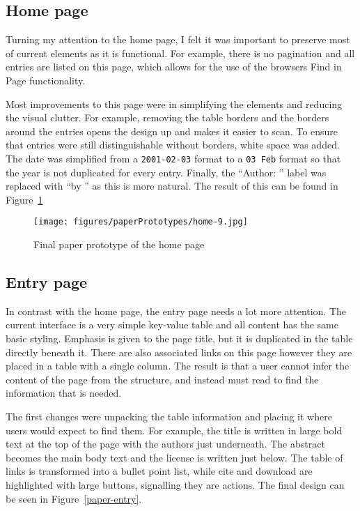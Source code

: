 \documentclass[bsc,frontabs,oneside,singlespacing,parskip,deptreport,logo]{infthesis}
\begin{document}
\subsection{Home page}

Turning my attention to the home page, I felt it was important to preserve most of current elements as it is functional. For example, there is no pagination and all entries are listed on this page, which allows for the use of the browsers Find in Page functionality. 

Most improvements to this page were in simplifying the elements and reducing the visual clutter. For example, removing the table borders and the borders around the entries opens the design up and makes it easier to scan. To ensure that entries were still distinguishable without borders, white space was added. The date was simplified from a \verb|2001-02-03| format to a \verb|03 Feb| format so that the year is not duplicated for every entry. Finally, the ``Author: '' label was replaced with ``by '' as this is more natural. The result of this can be found in Figure~\ref{paper-home}

\begin{figure}[h]
    \centering
    \texttt{[image: figures/paperPrototypes/home-9.jpg]}
    \caption{Final paper prototype of the home page}
    \label{paper-home}
\end{figure}

\subsection{Entry page}

In contrast with the home page, the entry page needs a lot more attention. The current interface is a very simple key-value table and all content has the same basic styling. Emphasis is given to the page title, but it is duplicated in the table directly beneath it. There are also associated links on this page however they are placed in a table with a single column. The result is that a user cannot infer the content of the page from the structure, and instead must read to find the information that is needed.

The first changes were unpacking the table information and placing it where users would expect to find them. For example, the title is written in large bold text at the top of the page with the authors just underneath. The abstract becomes the main body text and the license is written just below. The table of links is transformed into a bullet point list, while cite and download are highlighted with large buttons, signalling they are actions. The final design can be seen in Figure~\ref{paper-entry}.
\end{document}
